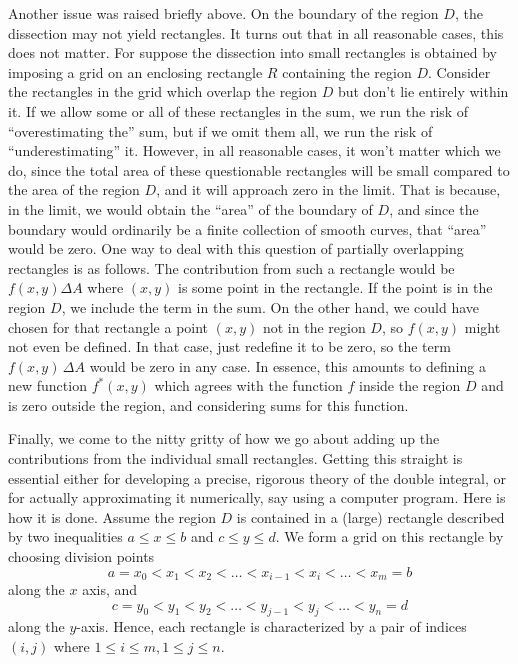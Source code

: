 Another issue was raised briefly above.  On the boundary of
%
the region $D$, the dissection may not yield rectangles.
It turns out that in all reasonable cases, this does not matter.
For suppose the dissection into small rectangles is obtained by
imposing a grid on an enclosing rectangle $R$ containing the
region $D$.   Consider the rectangles in the grid which overlap
the region $D$ but don't lie entirely within it.  If we allow
some or all of these rectangles in the sum, we run the risk
of ``overestimating the'' sum, but if we omit them all, we
run the risk of ``underestimating'' it.   However, in all reasonable
cases, it won't matter which we do, since the total area of these
questionable rectangles will be small compared to the area of
the region $D$, and it will approach zero in the limit.  That is
because, in the limit, we would obtain the ``area'' of the
boundary of $D$, and since the boundary would ordinarily be a finite
collection of smooth curves, that ``area'' would be zero.
One way to deal with this question of partially overlapping
rectangles is as follows.  The contribution from such a rectangle
would be $f(x,y)\Delta A$ where $(x,y)$ is some point in the
rectangle.  If the point is in the region $D$, we include the
term in the sum.  On the other hand, we could have chosen for
that rectangle a point $(x,y)$ not in the region $D$, so
$f(x,y)$ might not even be defined.  In that case, just redefine
it to be zero, so the term $f(x,y)\,\Delta A$ would be zero in
any case.  In essence, this amounts to defining a new function
$f^*(x,y)$ which agrees with the function $f$ inside the region
$D$ and is zero outside the region, and considering sums for
this function.   
\medskip
\centerline{}
\medskip
Finally, we come to the nitty gritty of how we go about adding
up the contributions from the individual small rectangles.   Getting
this straight is essential either for developing a precise,
rigorous theory of the double integral, or for actually
approximating it numerically, say using a computer program.
Here is how it is done.   Assume the region $D$ is contained
in a (large) rectangle described by two inequalities
$a \le x \le b$ and $c\le y \le d$.   We form a grid on this
rectangle by choosing division points
$$
    a = x_0 < x_1 < x_2 < \dots < x_{i-1} < x_i < \dots < x_m = b
$$
along the $x$ axis, and
$$
    c = y_0 < y_1 < y_2 < \dots < y_{j-1} < y_j < \dots < y_n = d
$$
along the $y$-axis.  Hence, each rectangle is characterized
by a pair of indices $(i,j)$ where $1\le i \le m, 1\le j \le n$.
